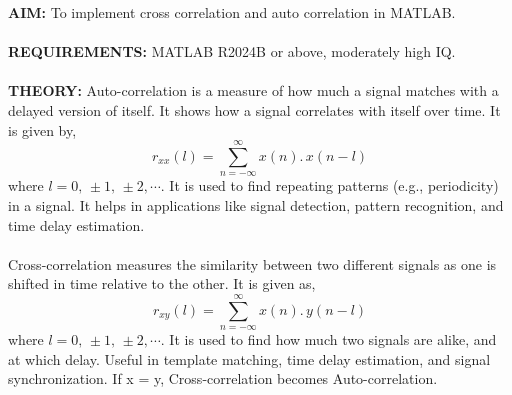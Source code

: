 \documentclass[12pt]{report}
\begin{document}
  \noindent \textbf{AIM:} To implement cross correlation and auto correlation in MATLAB. \\ \\
  \textbf{REQUIREMENTS:} MATLAB R2024B or above, moderately high IQ. \\ \\
  \textbf{THEORY:} Auto-correlation is a measure of how much a signal matches with a delayed version of itself. It shows how a signal correlates with itself over time. It is given by, \cite{profnotes} \[ r_{xx}(l) = \sum_{n = -\infty}^{\infty} x(n) . \, x(n-l) \] where $ l = 0, \, \pm 1, \, \pm 2, \cdots $. It is used to find repeating patterns (e.g., periodicity) in a signal. It helps in applications like signal detection, pattern recognition, and time delay estimation. \\ \\

  Cross-correlation measures the similarity between two different signals as one is shifted in time relative to the other. It is given as, \[ r_{xy}(l) = \sum_{n = -\infty}^{\infty} x(n). \, y(n-l) \] where  $ l = 0, \, \pm 1, \, \pm 2, \cdots $. It is used to find how much two signals are alike, and at which delay. Useful in template matching, time delay estimation, and signal synchronization. If x = y, Cross-correlation becomes Auto-correlation. \cite{profnotes} \\ \\
\end{document}

